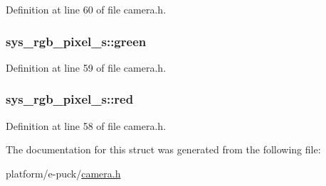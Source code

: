 Definition at line 60 of file camera.\+h.

\hypertarget{structsys__rgb__pixel__s_aad4178b262be3365f99a3cadece2f528}{}
\subsubsection[{green}]{ sys\+\_\+rgb\+\_\+pixel\+\_\+s\+::green}\label{structsys__rgb__pixel__s_aad4178b262be3365f99a3cadece2f528}


Definition at line 59 of file camera.\+h.

\hypertarget{structsys__rgb__pixel__s_a8f0985f9f96d4c7a6723aa10dcacc93b}{}
\subsubsection[{red}]{ sys\+\_\+rgb\+\_\+pixel\+\_\+s\+::red}\label{structsys__rgb__pixel__s_a8f0985f9f96d4c7a6723aa10dcacc93b}


Definition at line 58 of file camera.\+h.



The documentation for this struct was generated from the following file\+:\begin{DoxyCompactItemize}
\item 
platform/e-\/puck/\hyperlink{camera_8h}{camera.\+h}\end{DoxyCompactItemize}
